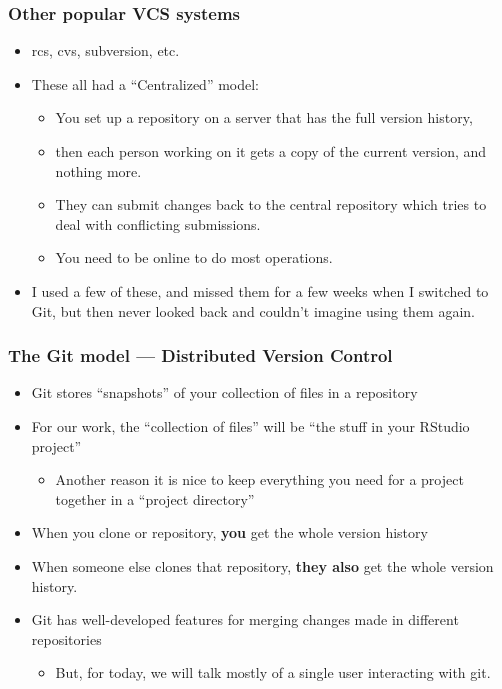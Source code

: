 \documentclass[]{book}
\providecommand{\tightlist}{%
  \setlength{\itemsep}{0pt}\setlength{\parskip}{0pt}}
\theoremstyle{definition}
\theoremstyle{definition}
\theoremstyle{remark}
\begin{document}
\subsubsection{Other popular VCS
systems}\label{other-popular-vcs-systems}

\begin{itemize}
\tightlist
\item
  rcs, cvs, subversion, etc.
\item
  These all had a ``Centralized'' model:

  \begin{itemize}
  \tightlist
  \item
    You set up a repository on a server that has the full version
    history,
  \item
    then each person working on it gets a copy of the current version,
    and nothing more.
  \item
    They can submit changes back to the central repository which tries
    to deal with conflicting submissions.
  \item
    You need to be online to do most operations.
  \end{itemize}
\item
  I used a few of these, and missed them for a few weeks when I switched
  to Git, but then never looked back and couldn't imagine using them
  again.
\end{itemize}

\subsubsection{The Git model --- Distributed Version
Control}\label{the-git-model-distributed-version-control}

\begin{itemize}
\tightlist
\item
  Git stores ``snapshots'' of your collection of files in a repository
\item
  For our work, the ``collection of files'' will be ``the stuff in your
  RStudio project''

  \begin{itemize}
  \tightlist
  \item
    Another reason it is nice to keep everything you need for a project
    together in a ``project directory''
  \end{itemize}
\item
  When you clone or repository, \textbf{you} get the whole version
  history
\item
  When someone else clones that repository, \textbf{they also} get the
  whole version history.
\item
  Git has well-developed features for merging changes made in different
  repositories

  \begin{itemize}
  \tightlist
  \item
    But, for today, we will talk mostly of a single user interacting
    with git.
  \end{itemize}
\end{itemize}
\end{document}
